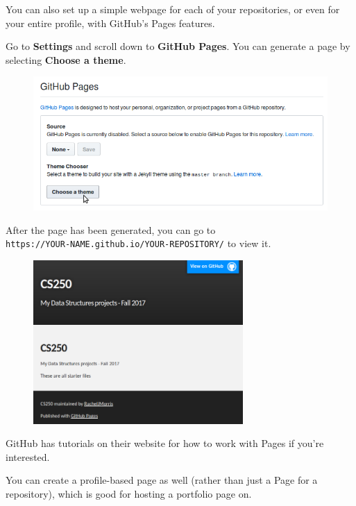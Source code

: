 \documentclass[a4paper,12pt,oneside]{book}
\begin{document}
        You can also set up a simple webpage for each of your repositories,
        or even for your entire profile, with GitHub's Pages features.

        Go to \textbf{Settings} and scroll down to \textbf{GitHub Pages}.
        You can generate a page by selecting \textbf{Choose a theme}.

        \begin{figure}[h]
            \centering
            \includegraphics[width=14cm]{images/github-pages.png}
        \end{figure}

        After the page has been generated, you can go to \\
            \texttt{https://YOUR-NAME.github.io/YOUR-REPOSITORY/}
        to view it.

        \begin{figure}[h]
            \centering
            \includegraphics[width=8cm]{images/github-pages3.png}
        \end{figure}

        GitHub has tutorials on their website for how to work with Pages
        if you're interested.

        You can create a profile-based page as well (rather than just a
        Page for a repository), which is good for hosting a portfolio page on.

        
\end{document}
